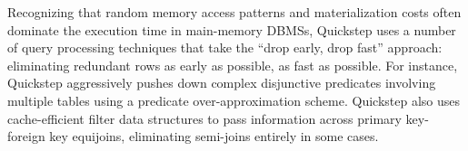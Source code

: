Recognizing that random memory access patterns and materialization costs often dominate the execution time in main-memory DBMSs, Quickstep uses a number of query processing techniques that take the ``drop early, drop fast'' approach: eliminating redundant rows as early as possible, as fast as possible. For instance, Quickstep aggressively pushes down complex disjunctive predicates involving multiple tables using a %
predicate over-approximation scheme. Quickstep also uses cache-efficient filter data structures to pass information across primary key-foreign key equijoins,  eliminating semi-joins entirely in some cases. %





